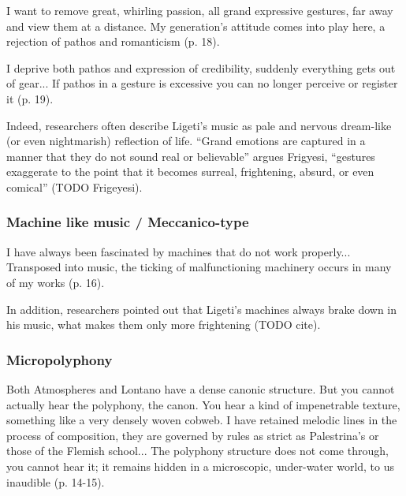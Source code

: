 \documentclass[a4paper,11pt]{article}
\newenvironment{MyShadequote}[1][]{%
    \ignorespaces%
    \begin{mdframed}[style=MyShadeQuoteStyle,#1]%
}{%
    \end{mdframed}%
    \ignorespacesafterend%
}%
\begin{document}
\begin{MyShadequote}
  I want to remove great, whirling passion, all grand expressive gestures, far away and view them at a distance.
  My generation's attitude comes into play here, a rejection of pathos and romanticism (p. 18).
\end{MyShadequote}

\begin{MyShadequote}
  I deprive both pathos and expression of credibility, suddenly everything gets out of gear...
  If pathos in a gesture is excessive you can no longer perceive or register it (p. 19).
\end{MyShadequote}

Indeed, researchers often describe Ligeti's music as pale and nervous dream-like (or even nightmarish) reflection of life.
``Grand emotions are captured in a manner that they do not sound real or believable'' argues Frigyesi, ``gestures exaggerate to the point that it becomes surreal, frightening, absurd, or even comical'' (TODO Frigeyesi).

\subsubsection{Machine like music / Meccanico-type}
\label{subs:ligeti:machine}

\begin{MyShadequote}
  I have always been fascinated by machines that do not work properly...
  Transposed into music, the ticking of malfunctioning machinery occurs in many of my works (p. 16).
\end{MyShadequote}

In addition, researchers pointed out that Ligeti's machines always brake down in his music, what makes them only more frightening (TODO cite).

\subsubsection{Micropolyphony}
\label{subs:ligeti:micropolyphony}

\begin{MyShadequote}
  Both Atmospheres and Lontano have a dense canonic structure.
  But you cannot actually hear the polyphony, the canon.
  You hear a kind of impenetrable texture, something like a very densely woven cobweb.
  I have retained melodic lines in the process of composition, they are governed by rules as strict as Palestrina’s or those of the Flemish school...
  The polyphony structure does not come through, you cannot hear it; it remains hidden in a microscopic, under-water world, to us inaudible (p. 14-15).
\end{MyShadequote}
\end{document}
